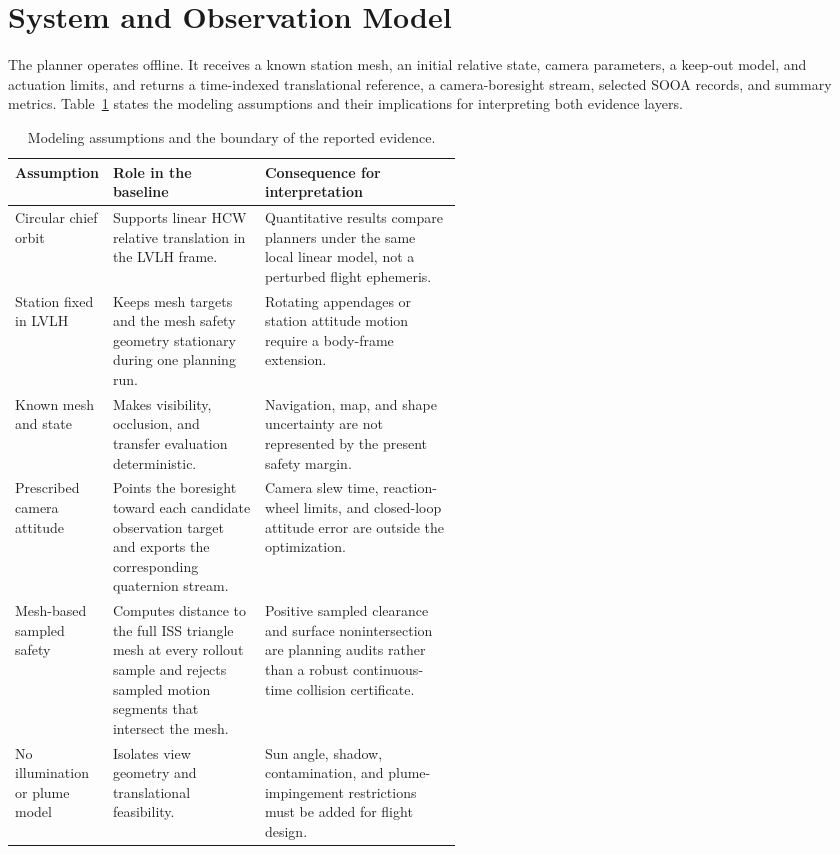 \documentclass{IEEEtaes}
\theoremstyle{remark}
\theoremstyle{plain}
\begin{document}
\section{System and Observation Model}
\label{sec:system}

The planner operates offline. It receives a known station mesh, an initial relative state, camera parameters, a keep-out model, and actuation limits, and returns a time-indexed translational reference, a camera-boresight stream, selected SOOA records, and summary metrics. Table~\ref{tab:assumptions} states the modeling assumptions and their implications for interpreting both evidence layers.

\begin{table}[t]
  \centering
  \caption{Modeling assumptions and the boundary of the reported evidence.}
  \label{tab:assumptions}
  \renewcommand{\arraystretch}{1.08}
  \setlength{\tabcolsep}{5pt}
  \footnotesize
  \begin{tabularx}{\linewidth}{@{}p{0.18\linewidth}p{0.34\linewidth}X@{}}
    \toprule
    Assumption & Role in the baseline & Consequence for interpretation \\
    \midrule
    Circular chief orbit & Supports linear HCW relative translation in the LVLH frame. & Quantitative results compare planners under the same local linear model, not a perturbed flight ephemeris. \\
    Station fixed in LVLH & Keeps mesh targets and the mesh safety geometry stationary during one planning run. & Rotating appendages or station attitude motion require a body-frame extension. \\
    Known mesh and state & Makes visibility, occlusion, and transfer evaluation deterministic. & Navigation, map, and shape uncertainty are not represented by the present safety margin. \\
    Prescribed camera attitude & Points the boresight toward each candidate observation target and exports the corresponding quaternion stream. & Camera slew time, reaction-wheel limits, and closed-loop attitude error are outside the optimization. \\
    Mesh-based sampled safety & Computes distance to the full ISS triangle mesh at every rollout sample and rejects sampled motion segments that intersect the mesh. & Positive sampled clearance and surface nonintersection are planning audits rather than a robust continuous-time collision certificate. \\
    No illumination or plume model & Isolates view geometry and translational feasibility. & Sun angle, shadow, contamination, and plume-impingement restrictions must be added for flight design. \\
    \bottomrule
  \end{tabularx}
\end{table}
\end{document}
